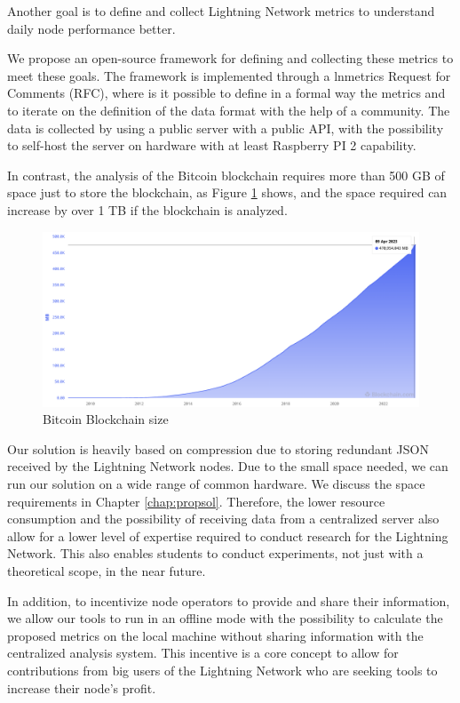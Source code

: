 Another goal is to define and collect Lightning Network
metrics to understand daily node performance better. 

We propose an open-source framework
for defining and collecting these metrics to meet these goals. The framework
is implemented through a lnmetrics Request for Comments (RFC), where is it possible to define
in a formal way the metrics and to iterate on the definition of the data format with the
help of a community.
The data is collected by using a public server with a public API, with the possibility to
self-host the server on hardware with at least Raspberry PI 2 capability.

In contrast, the analysis of the Bitcoin blockchain requires more than
500 GB of space just to store the blockchain, as Figure \ref{fig:blockchain_size} shows,
and the space required can increase by over 1 TB if the blockchain is analyzed.

\begin{figure}[h]
  \begin{center}
    \includegraphics[width=0.6\columnwidth]{imgs/bitcoin-blockchain-size.png}
  \end{center}
  \caption{Bitcoin Blockchain size}
  \label{fig:blockchain_size}
\end{figure}

Our solution is heavily based on compression due to storing redundant JSON received
by the Lightning Network nodes. Due to the small space needed, we can run our solution on a
wide range of common hardware. We discuss the space requirements in Chapter \ref{chap:propsol}.
Therefore, the lower resource consumption and the possibility of receiving data from a
centralized server also allow for a lower level of expertise required to conduct
research for the Lightning Network. This also enables students to conduct
experiments, not just with a theoretical scope, in the near future.

In addition, to incentivize node operators to provide and share their information, we allow our
tools to run in an offline mode with the possibility to calculate the proposed metrics on the
local machine without sharing information with the centralized analysis system. This incentive
is a core concept to allow for contributions from big users of the Lightning Network who are
seeking tools to increase their node's profit.

